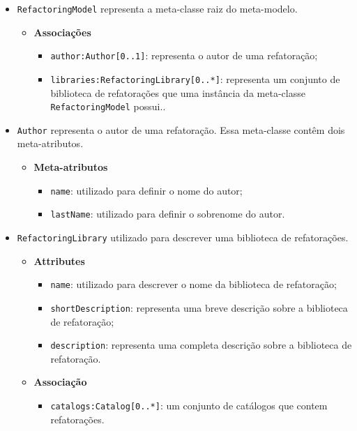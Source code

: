 \begin{itemize}
\item \texttt{RefactoringModel} representa a meta-classe raiz do meta-modelo.

\begin{itemize}
	\item \textbf{Associações}
		\begin{itemize}
			\item \texttt{author:Author[0..1]}: representa o autor de uma refatoração; 
			\item \texttt{libraries:RefactoringLibrary[0..*]}: representa um conjunto de biblioteca de refatorações que uma instância da meta-classe \texttt{RefactoringModel} possui..
		\end{itemize}
\end{itemize}

\item \texttt{Author} representa o autor de uma refatoração. Essa meta-classe contêm dois meta-atributos.

\begin{itemize}
	\item \textbf{Meta-atributos}
		\begin{itemize}
			\item \texttt{name}: utilizado para definir o nome do autor;
			\item \texttt{lastName}: utilizado para definir o sobrenome do autor.
		\end{itemize}	
\end{itemize} 

\item \texttt{RefactoringLibrary} utilizado para descrever uma biblioteca de refatorações.

\begin{itemize}
	\item \textbf{Attributes}
		\begin{itemize}
			\item \texttt{name}: utilizado para descrever o nome da biblioteca de refatoração;
			\item \texttt{shortDescription}: representa uma breve descrição sobre a biblioteca de refatoração;
			\item \texttt{description}: representa uma completa descrição sobre a biblioteca de refatoração.
		\end{itemize}	
\end{itemize} 

\begin{itemize}
	\item \textbf{Associação}
		\begin{itemize}
			\item \texttt{catalogs:Catalog[0..*]}: um conjunto de catálogos que contem refatorações.
		\end{itemize}	
\end{itemize} 


\end{itemize}
